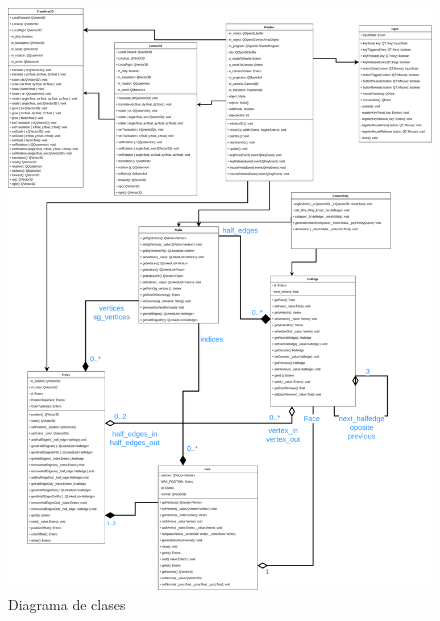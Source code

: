 \begin{figure} %
	\centering
	\includegraphics[scale=0.25]{imagenes/diagramaClases.png} 
	\caption{ Diagrama de clases } \label{fig:diagramaClases.png}
\end{figure}

